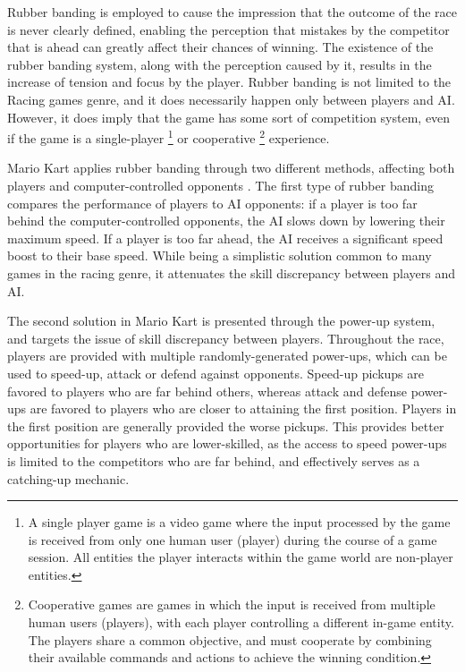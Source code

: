 Rubber banding is employed to cause the impression that the outcome of the race is never clearly defined, enabling the perception that mistakes by the competitor that is ahead can greatly affect their chances of winning. The existence of the rubber banding system, along with the perception caused by it, results in the increase of tension and focus by the player. Rubber banding is not limited to the Racing games genre, and it does necessarily happen only between players and AI. However, it does imply that the game has some sort of competition system, even if the game is a single-player \footnote{A single player game is a video game where the input processed by the game is received from only one human user (player) during the course of a game session. All entities the player interacts within the game world are non-player entities.} or cooperative \footnote{Cooperative games are games in which the input is received from multiple human users (players), with each player controlling a different in-game entity. The players share a common objective, and must cooperate by combining their available commands and actions to achieve the winning condition.} experience.

Mario Kart applies rubber banding through two different methods, affecting both players and computer-controlled opponents \cite{website_rubberbandingmariokart}. The first type of rubber banding compares the performance of players to AI opponents: if a player is too far behind the computer-controlled opponents, the AI slows down by lowering their maximum speed. If a player is too far ahead, the AI receives a significant speed boost to their base speed. While being a simplistic solution common to many games in the racing genre, it attenuates the skill discrepancy between players and AI. 

The second solution in Mario Kart is presented through the power-up system, and targets the issue of skill discrepancy between players. Throughout the race, players are provided with multiple randomly-generated power-ups, which can be used to speed-up, attack or defend against opponents. Speed-up pickups are favored to players who are far behind others, whereas attack and defense power-ups are favored to players who are closer to attaining the first position. Players in the first position are generally provided the worse pickups. This provides better opportunities for players who are lower-skilled, as the access to speed power-ups is limited to the competitors who are far behind, and effectively serves as a catching-up mechanic.

